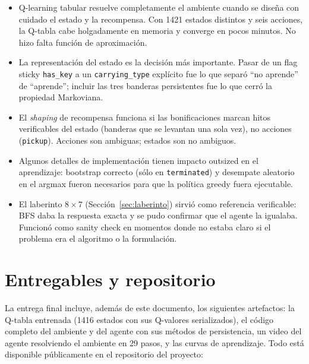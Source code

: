 \documentclass[11pt,a4paper]{article}
\begin{document}
\begin{itemize}[leftmargin=*]
  \item Q-learning tabular resuelve completamente el ambiente cuando se
        diseña con cuidado el estado y la recompensa. Con \num{1421}
        estados distintos y seis acciones, la Q-tabla cabe holgadamente
        en memoria y converge en pocos minutos. No hizo falta función
        de aproximación.
  \item La representación del estado es la decisión más importante.
        Pasar de un flag sticky \texttt{has\_key} a un
        \texttt{carrying\_type} explícito fue lo que separó ``no
        aprende'' de ``aprende''; incluir las tres banderas
        persistentes fue lo que cerró la propiedad Markoviana.
  \item El \emph{shaping} de recompensa funciona si las bonificaciones
        marcan hitos verificables del estado (banderas que se levantan
        una sola vez), no acciones (\texttt{pickup}). Acciones son
        ambiguas; estados son no ambiguos.
  \item Algunos detalles de implementación tienen impacto outsized en
        el aprendizaje: bootstrap correcto (sólo en \texttt{terminated})
        y desempate aleatorio en el argmax fueron necesarios para que la
        política greedy fuera ejecutable.
  \item El laberinto \(8\times 7\) (Sección~\ref{sec:laberinto}) sirvió
        como referencia verificable: BFS daba la respuesta exacta y se
        pudo confirmar que el agente la igualaba. Funcionó como sanity
        check en momentos donde no estaba claro si el problema era el
        algoritmo o la formulación.
\end{itemize}

\section{Entregables y repositorio}
\label{sec:entregables}

La entrega final incluye, además de este documento, los siguientes
artefactos: la Q-tabla entrenada (\num{1416} estados con sus Q-valores
serializados), el código completo del ambiente y del agente con sus
métodos de persistencia, un video del agente resolviendo el ambiente
en \num{29} pasos, y las curvas de aprendizaje. Todo está disponible
públicamente en el repositorio del proyecto:

\begin{center}
\end{center}
\end{document}
